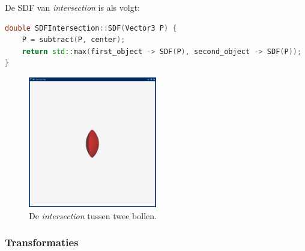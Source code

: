 \documentclass[12pt, a4paper]{article}
\begin{document}
De SDF van \emph{intersection} is als volgt:

\begin{lstlisting}[language=C++]
double SDFIntersection::SDF(Vector3 P) {
    P = subtract(P, center);
    return std::max(first_object -> SDF(P), second_object -> SDF(P));
}
\end{lstlisting}


\begin{figure}[H]
    \centering
    \includegraphics[width=0.50\textwidth]{renders/intersection.png}
    \caption{De \emph{intersection} tussen twee bollen.}
    \label{fig:intersection}
\end{figure}
\subsubsection{Transformaties}
\end{document}
